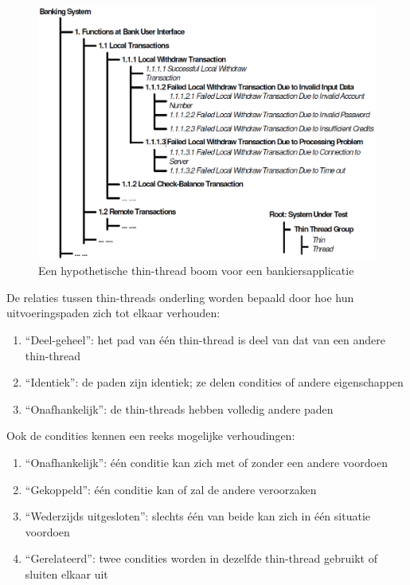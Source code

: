 \begin{figure}[h!]
    \centering
    \includegraphics[scale=0.45]{img/Tsai2001ThinThreadTree.png}
    \caption{Een hypothetische thin-thread boom voor een bankiersapplicatie ~\cite{Tsai2001}}
    \label{fig:tsaithinthreadtree}
\end{figure}

De relaties tussen thin-threads onderling worden bepaald door hoe hun uitvoeringspaden zich tot elkaar verhouden:

\begin{enumerate}
    \item ``Deel-geheel'': het pad van één thin-thread is deel van dat van een andere thin-thread
    \item ``Identiek'': de paden zijn identiek; ze delen condities of andere eigenschappen
    \item ``Onafhankelijk'': de thin-threads hebben volledig andere paden
\end{enumerate}

Ook de condities kennen een reeks mogelijke verhoudingen:

\begin{enumerate}
    \item ``Onafhankelijk'': één conditie kan zich met of zonder een andere voordoen
    \item ``Gekoppeld'': één conditie kan of zal de andere veroorzaken
    \item ``Wederzijds uitgesloten'': slechts één van beide kan zich in één situatie voordoen
    \item ``Gerelateerd'': twee condities worden in dezelfde thin-thread gebruikt of sluiten elkaar uit
\end{enumerate}

